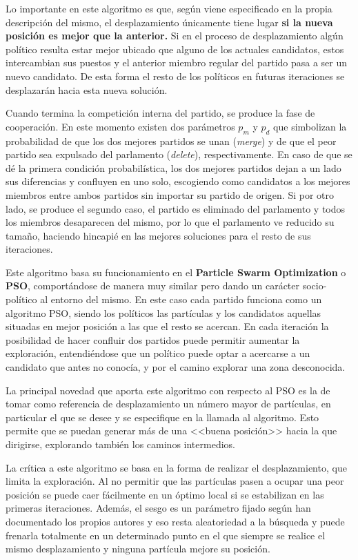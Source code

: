 Lo importante en este algoritmo es que, según viene especificado en la propia descripción del mismo, el desplazamiento únicamente tiene lugar \textbf{si la nueva posición es mejor que la anterior.} Si en el proceso de desplazamiento algún político resulta estar mejor ubicado que alguno de los actuales candidatos, estos intercambian sus puestos y el anterior miembro regular del partido pasa a ser un nuevo candidato. De esta forma el resto de los políticos en futuras iteraciones se desplazarán hacia esta nueva solución.

Cuando termina la competición interna del partido, se produce la fase de cooperación. En este momento existen dos parámetros $p_m$ y $p_d$ que simbolizan la probabilidad de que los dos mejores partidos se unan (\textit{merge}) y de que el peor partido sea expulsado del parlamento (\textit{delete}), respectivamente. En caso de que se dé la primera condición probabilística, los dos mejores partidos dejan a un lado sus diferencias y confluyen en uno solo, escogiendo como candidatos a los mejores miembros entre ambos partidos sin importar su partido de origen. Si por otro lado, se produce el segundo caso, el partido es eliminado del parlamento y todos los miembros desaparecen del mismo, por lo que el parlamento ve reducido su tamaño, haciendo hincapié en las mejores soluciones para el resto de sus iteraciones.

Este algoritmo basa su funcionamiento en el \textbf{Particle Swarm Optimization} o \textbf{PSO}, comportándose de manera muy similar pero dando un carácter socio-político al entorno del mismo. En este caso cada partido funciona como un algoritmo PSO, siendo los políticos las partículas y los candidatos aquellas situadas en mejor posición a las que el resto se acercan. En cada iteración la posibilidad de hacer confluir dos partidos puede permitir aumentar la exploración, entendiéndose que un político puede optar a acercarse a un candidato que antes no conocía, y por el camino explorar una zona desconocida.

La principal novedad que aporta este algoritmo con respecto al PSO es la de tomar como referencia de desplazamiento un número mayor de partículas, en particular el que se desee y se especifique en la llamada al algoritmo. Esto permite que se puedan generar más de una <<buena posición>> hacia la que dirigirse, explorando también los caminos intermedios.

La crítica a este algoritmo se basa en la forma de realizar el desplazamiento, que limita la exploración. Al no permitir que las partículas pasen a ocupar una peor posición se puede caer fácilmente en un óptimo local si se estabilizan en las primeras iteraciones. Además, el sesgo es un parámetro fijado según han documentado los propios autores \cite{poa-article} y eso resta aleatoriedad a la búsqueda y puede frenarla totalmente en un determinado punto en el que siempre se realice el mismo desplazamiento y ninguna partícula mejore su posición.

